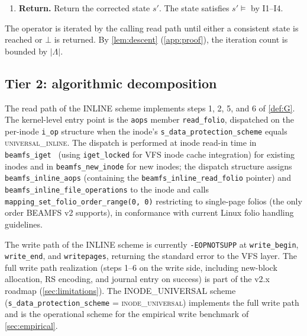 \begin{definition}
\begin{enumerate}
  \texttt{-EBADMSG} return from the decoder or a CRC32 mismatch
  after a putative successful decode on a region of
  \(\Lambda_{\mathrm{crc}}\), emit a journal entry by calling
  \texttt{beamfs\_log\_rs\_event} with
  \texttt{positions = NULL}, \texttt{n\_positions = 0}, and
  \texttt{flags |= BEAMFS\_RS\_EVENT\_FLAG\_UNCORRECTABLE}, with
  the affected \((\text{block}, \text{subblock})\) coordinates.
  Commit the journal entry to persistent storage. Return \(\bot\).
\item \textbf{Return.} Return the corrected state \(s'\). The
  state satisfies \(s' \models\) by I1--I4.
\end{enumerate}
\end{definition}

The operator is iterated by the calling read path until either a
consistent state is reached or \(\bot\) is returned. By \cref{lem:descent} (\cref{app:proof}), the iteration count is
bounded by \(|\Lambda|\).

\subsection{Tier 2: algorithmic decomposition}\label{ssec:m2c-tier2}

The read path of the INLINE scheme implements steps 1, 2, 5, and 6
of \cref{def:G}. The kernel-level entry point is the \texttt{aops}
member \texttt{read\_folio}, dispatched on the
per-inode \texttt{i\_op} structure when the inode's
\texttt{s\_data\_protection\_scheme} equals
\textsc{universal\_inline}. The dispatch is performed at inode read-in time in
\texttt{beamfs\_iget}~\cite{beamfs-impl} (using \texttt{iget\_locked}
for VFS inode cache integration) for existing inodes and in
\texttt{beamfs\_new\_inode} for new inodes; the dispatch
structure assigns \texttt{beamfs\_inline\_aops} (containing the
\texttt{beamfs\_inline\_read\_folio} pointer) and
\texttt{beamfs\_inline\_file\_operations} to the inode and calls
\texttt{mapping\_set\_folio\_order\_range(0, 0)} restricting to
single-page folios (the only order BEAMFS v2 supports), in
conformance with current Linux folio handling guidelines.

The write path of the INLINE scheme is currently
\texttt{-EOPNOTSUPP} at \texttt{write\_begin}, \texttt{write\_end},
and \texttt{writepages}, returning the standard error to the VFS
layer. The full write path realization (steps 1--6 on the write
side, including new-block allocation, RS encoding, and journal
entry on success) is part of the v2.x roadmap
(\cref{sec:limitations}). The INODE\_UNIVERSAL scheme
(\texttt{s\_data\_protection\_scheme} = \textsc{inode\_universal})
implements the full write path and is the operational scheme for
the empirical write benchmark of \cref{sec:empirical}.

